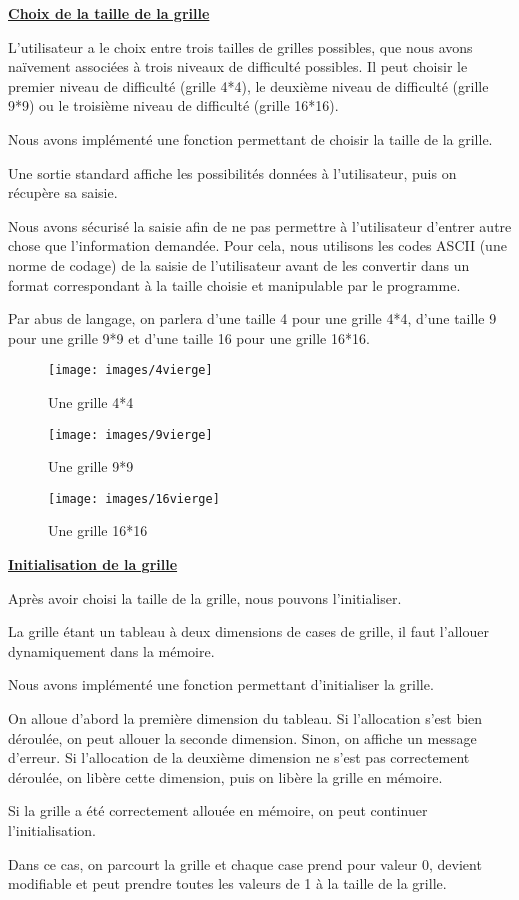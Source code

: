 \documentclass[a4paper, 12pt]{article}
\begin{document}
\underline{\textbf{Choix de la taille de la grille}}

	\par L'utilisateur a le choix entre trois tailles de grilles possibles, que nous avons naïvement associées à trois niveaux de difficulté possibles. Il peut choisir le premier niveau de difficulté (grille 4*4), le deuxième niveau de difficulté (grille 9*9) ou le troisième niveau de difficulté (grille 16*16).
	\par Nous avons implémenté une fonction permettant de choisir la taille de la grille. 
	\par Une sortie standard affiche les possibilités données à l'utilisateur, puis on récupère sa saisie.
	\par Nous avons sécurisé la saisie afin de ne pas permettre à l'utilisateur d'entrer autre chose que l'information demandée. Pour cela, nous utilisons les codes ASCII (une norme de codage) de la saisie de l'utilisateur avant de les convertir dans un format correspondant à la taille choisie et manipulable par le programme. 
	\par Par abus de langage, on parlera d'une taille 4 pour une grille 4*4, d'une taille 9 pour une grille 9*9 et d'une taille 16 pour une grille 16*16.\\

	\begin{figure}[H]
		\caption{Une grille 4*4}
		\centering
		\texttt{[image: images/4vierge]}
	\end{figure}

	\begin{figure}[H]
		\caption{Une grille 9*9}
		\centering
		\texttt{[image: images/9vierge]}
	\end{figure}

	\begin{figure}[H]
		\caption{Une grille 16*16}
		\centering
		\texttt{[image: images/16vierge]}
	\end{figure}

\underline{\textbf{Initialisation de la grille}}

	\par Après avoir choisi la taille de la grille, nous pouvons l'initialiser.
	\par La grille étant un tableau à deux dimensions de cases de grille, il faut l'allouer dynamiquement dans la mémoire. 
	\par Nous avons implémenté une fonction permettant d'initialiser la grille.
	\par On alloue d'abord la première dimension du tableau. Si l'allocation s'est bien déroulée, on peut allouer la seconde dimension. Sinon, on affiche un message d'erreur. Si l'allocation de la deuxième dimension ne s'est pas correctement déroulée, on libère cette dimension, puis on libère la grille en mémoire.
	\par Si la grille a été correctement allouée en mémoire, on peut continuer l'initialisation.
	\par Dans ce cas, on parcourt la grille et chaque case prend pour valeur 0, devient modifiable et peut prendre toutes les valeurs de 1 à la taille de la grille.\\
\end{document}
